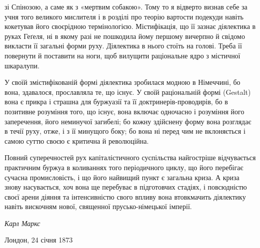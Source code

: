 \parcont{}  %
зі Спінозою, а саме як з «мертвим собакою». Тому то я відверто
визнав себе за учня того великого мислителя і в розділі про теорію
вартости подекуди навіть кокетував його своєрідною термінологією.
Містифікація, що її зазнає діялектика в руках Геґеля, ні в
якому разі не пошкодила йому першому вичерпно й свідомо викласти
її загальні форми руху. Діялектика в нього стоїть на голові.
Треба її повернути й поставити на ноги, щоб вилущити раціональне
ядро з містичної шкаралупи.

У своїй змістифікованій формі діялектика зробилася модною
в Німеччині, бо вона, здавалося, прославляла те, що існує.
У своїй раціональній формі (Gestalt) вона є прикра і страшна для
буржуазії та її доктринерів-проводирів, бо в позитивне розуміння
того, що існує, вона включає одночасно і розуміння його
заперечення, його неминучої загибелі; бо кожну здійснену форму
вона розглядає в течії руху, отже, і з її минущого боку; бо вона
ні перед чим не вклоняється і самою суттю своєю є критична
й революційна.

Повний суперечностей рух капіталістичного суспільства найгостріше
відчувається практичним буржуа в коливаннях того періодичного
циклу, що його перебігає сучасна промисловість, і що
його найвищий пункт є загальна криза. А криза знову насувається,
хоч вона ще перебуває в підготовчих стадіях, і повсюдністю
своєї арени діяння та інтенсивністю свого впливу вона
втовкмачить діялектику навіть вискочням нової, священної прусько-німецької
імперії.

\begin{flushright}
\emph{Карл Маркс}
\end{flushright}

{\small Лондон, 24 січня 1873~}
\label{original-88}